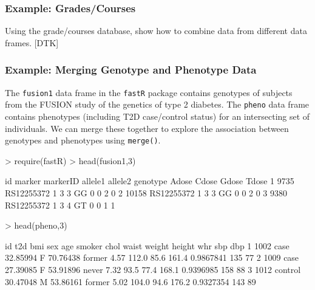 \subsubsection*{Example: Grades/Courses}

Using the grade/courses database, show how to combine data from
different data frames. [DTK]

\subsubsection{Example: Merging Genotype and Phenotype Data}
The \verb!fusion1! data frame in the \verb!fastR! package contains
genotypes of subjects from the FUSION study of the genetics of type 
2 diabetes.
The \verb!pheno! data frame contains phenotypes (including T2D 
case/control status) for an intersecting set of individuals.
We can merge these together to explore the association between
genotypes and phenotypes using \verb!merge()!.
\pagebreak

\begin{Schunk}
\begin{Sinput}
> require(fastR)
> head(fusion1,3)
\end{Sinput}
\begin{Soutput}
     id     marker markerID allele1 allele2 genotype Adose Cdose Gdose Tdose
1  9735 RS12255372        1       3       3       GG     0     0     2     0
2 10158 RS12255372        1       3       3       GG     0     0     2     0
3  9380 RS12255372        1       3       4       GT     0     0     1     1
\end{Soutput}
\begin{Sinput}
> head(pheno,3)
\end{Sinput}
\begin{Soutput}
    id     t2d      bmi sex      age smoker chol waist weight height       whr sbp dbp
1 1002    case 32.85994   F 70.76438 former 4.57 112.0   85.6  161.4 0.9867841 135  77
2 1009    case 27.39085   F 53.91896  never 7.32  93.5   77.4  168.1 0.9396985 158  88
3 1012 control 30.47048   M 53.86161 former 5.02 104.0   94.6  176.2 0.9327354 143  89
\end{Soutput}
\end{Schunk}

